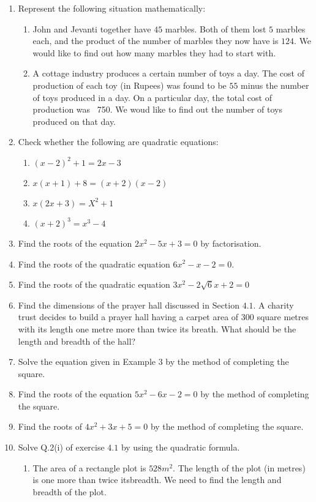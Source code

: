 \begin{enumerate}
\item Represent the following situation mathematically:
\begin{enumerate}[label=(\roman*)]
\item John and Jevanti together have $45$ marbles. Both of them lost $5$ marbles each, and the product of the number of marbles they now have is $124$. We would like to find out how many marbles they had to start with.
\item A cottage industry produces a certain number of toys a day. The cost of production of each toy (in Rupees) was found to be $55$ minus the number of toys produced in a day. On a particular day, the total cost of production was \rupee~750. We woud like to find out the number of toys produced on that day.
\end{enumerate}
\item Check whether the following are quadratic equations:
\begin{enumerate}[label=(\roman*)]
\item $(x-2)^2+1=2x-3$
\item $x(x+1)+8 = (x+2) (x-2)$
\item $x(2x+3) = X^2+1$
\item $(x+2)^3 = x^3-4$
\end{enumerate}
\item Find the roots of the equation $2x^2 -5x+3 = 0$  by factorisation.
\item Find the roots of the quadratic equation $6x^2 -x-2 = 0$.
\item Find the roots of the quadratic equation $3x^2 -2\sqrt6x+2 = 0$
\item Find the dimensions of the prayer hall discussed in Section $4.1$. A charity trust decides to build a prayer hall having a carpet area of 300 square metres with its length one metre more than twice its breath. What should be the length and breadth of the hall?
\item Solve the equation given in Example $3$ by the method of completing the square.
\item Find the roots of the equation $5x^2-6x-2 = 0$ by the method of completing the square.
\item Find the roots of $4x^2+3x+5 = 0$ by the method of completing the square.
\item Solve Q.2(i) of exercise $4.1$ by using the quadratic formula.
\begin{enumerate}[label=(\roman*)]
\item The area of a rectangle plot is $528 m^2$. The length of the plot (in metres) is one more than twice itsbreadth. We need to find the length and breadth of the plot.

\end{enumerate}
\end{enumerate}

